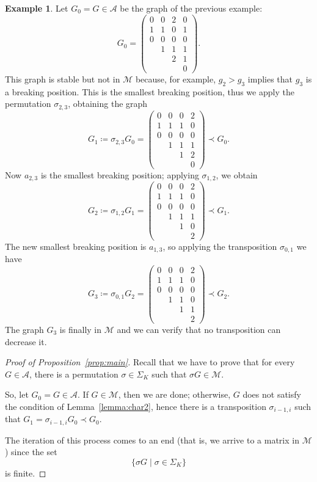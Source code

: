 \documentclass{amsart}
\theoremstyle{plain}
\theoremstyle{definition}
\newtheorem{example}[theorem]{Example}
\newcommand{\psm}[1]{\left(\begin{smallmatrix}#1\end{smallmatrix}\right)}
\begin{document}
\begin{example}
  Let $G_0 = G \in \mathcal{A}$ be the graph of the previous
  example:
  \[
  G_0 = \psm{ 0 & 0 & 2 & 0\\ 1 & 1 & 0 & 1\\ 0 & 0 & 0 & 0\\ & 1 & 1
    & 1\\ && 2 & 1\\ &&& 0 }\text{.}
  \]
  This graph is stable but not in $\mathcal{M}$ because, for example,
  $g_2 > g_3$ implies that $g_3$ is a breaking position. This is
  the smallest breaking position, thus we apply the permutation $\sigma_{2,3}$, obtaining
  the graph
  \[
  G_1 \coloneqq \sigma_{2,3} G_0 = \psm{ 0 & 0 & 0 & 2\\
    1 & 1 & 1 & 0\\ 0 & 0 & 0 & 0\\ & 1 & 1 & 1\\ && 1 & 2\\ &&& 0 }
  \prec G_0\text{.}
  \]
  Now $a_{2,3}$ is the smallest breaking position; applying
  $\sigma_{1,2}$, we obtain
  \[
  G_2 \coloneqq \sigma_{1,2} G_1 = \psm{ 0 & 0 & 0 & 2\\ 1 & 1 & 1 &
    0\\ 0 & 0 & 0 & 0\\ & 1 & 1 & 1\\ && 1 & 0\\ &&& 2 } \prec
  G_1\text{.}
  \]
  The new smallest breaking position is $a_{1,3}$, so applying the
  transposition $\sigma_{0,1}$ we have
  \[
  G_3 \coloneqq \sigma_{0,1} G_2 = \psm{ 0 & 0 & 0 & 2\\ 1 & 1 & 1 &
    0\\ 0 & 0 & 0 & 0\\ & 1 & 1 & 0\\ && 1 & 1\\ &&& 2 } \prec
  G_2\text{.}
  \]
  The graph $G_3$ is finally in $\mathcal{M}$ and we can verify that no
  transposition can decrease it.
\end{example}

\begin{proof}[Proof of Proposition~\ref{prop:main}]
  Recall that we have to prove that for every $G \in \mathcal{A}$,
  there is a permutation $\sigma \in \Sigma_K$ such that $\sigma G \in
  \mathcal{M}$.

  So, let $G_0 = G \in \mathcal{A}$. If $G \in \mathcal{M}$, then we
  are done; otherwise, $G$ does not satisfy the condition of
  Lemma~\ref{lemma:char2}, hence there is a transposition
  $\sigma_{i-1, i}$ such that $G_1 = \sigma_{i-1,i} G_0 \prec G_0$.

  The iteration of this process comes to an end (that is, we arrive to
  a matrix in $\mathcal{M}$) since the set
  \[
  \bigl\{ \sigma G \mid \sigma \in \Sigma_K\bigr\}
  \]
  is finite.
\end{proof}
\end{document}
